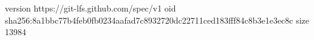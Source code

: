 version https://git-lfs.github.com/spec/v1
oid sha256:8a1bbc77b4feb0fb0234aafad7c8932720dc22711ced183fff84c8b3e1e3ec8c
size 13984
